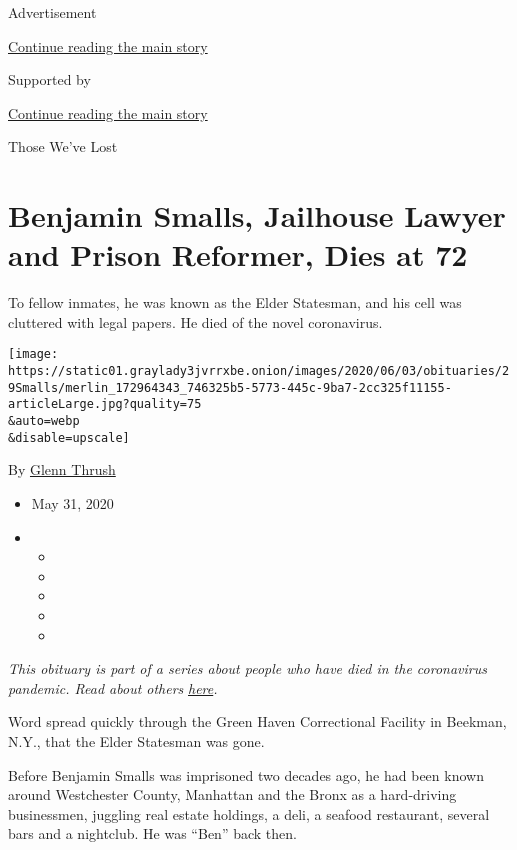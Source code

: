 Advertisement

\protect\hyperlink{after-top}{Continue reading the main story}

Supported by

\protect\hyperlink{after-sponsor}{Continue reading the main story}

Those We've Lost

\hypertarget{benjamin-smalls-jailhouse-lawyer-and-prison-reformer-dies-at-72}{%
\section{Benjamin Smalls, Jailhouse Lawyer and Prison Reformer, Dies at
72}\label{benjamin-smalls-jailhouse-lawyer-and-prison-reformer-dies-at-72}}

To fellow inmates, he was known as the Elder Statesman, and his cell was
cluttered with legal papers. He died of the novel coronavirus.

\texttt{[image: https://static01.graylady3jvrrxbe.onion/images/2020/06/03/obituaries/29Smalls/merlin\_172964343\_746325b5-5773-445c-9ba7-2cc325f11155-articleLarge.jpg?quality=75\\\&auto=webp\\\&disable=upscale]}

By \href{https://www.nytimes3xbfgragh.onion/by/glenn-thrush}{Glenn
Thrush}

\begin{itemize}
\item
  May 31, 2020
\item
  \begin{itemize}
  \item
  \item
  \item
  \item
  \item
  \end{itemize}
\end{itemize}

\emph{This obituary is part of a series about people who have died in
the coronavirus pandemic. Read about others}
\href{https://www.nytimes3xbfgragh.onion/series/people-who-have-died-of-the-coronavirus}{\emph{here}}\emph{.}

Word spread quickly through the Green Haven Correctional Facility in
Beekman, N.Y., that the Elder Statesman was gone.

Before Benjamin Smalls was imprisoned two decades ago, he had been known
around Westchester County, Manhattan and the Bronx as a hard-driving
businessmen, juggling real estate holdings, a deli, a seafood
restaurant, several bars and a nightclub. He was ``Ben'' back then.


